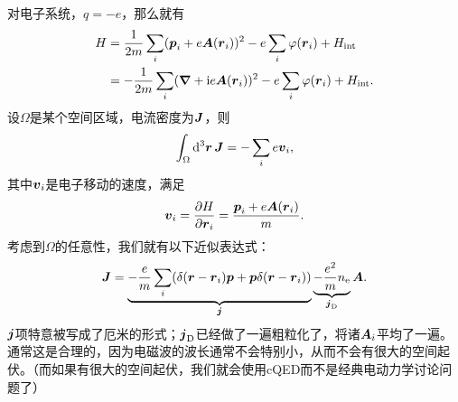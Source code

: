 对电子系统，$q=-e$，那么就有
\begin{equation}
    \begin{aligned}
        {H} &= \frac{1}{2m} \sum_i ({\vb*{p}_i} + e \vb*{A}({\vb*{r}_i}))^2 - e \sum_i \varphi({\vb*{r}}_i) + {H}_\text{int} \\ 
        &= - \frac{1}{2m} \sum_i (\grad + \mathrm{i} e \vb*{A}({\vb*{r}_i}))^2 - e \sum_i \varphi({\vb*{r}}_i) + {H}_\text{int}.
    \end{aligned}
\end{equation}
设$\Omega$是某个空间区域，电流密度为$\vb*{J}$，则
\begin{equation}
    \int_\Omega \dd[3]{\vb*{r}} {\vb*{J}} = - \sum_i e {\vb*{v}}_i,
\end{equation}
其中$\vb*{v}_i$是电子移动的速度，满足
\begin{equation}
    {\vb*{v}}_i = \pdv{H}{\vb*{r}_i} = \frac{{\vb*{p}}_i + e \vb*{A}({\vb*{r}}_i)}{m}.
\end{equation}
考虑到$\Omega$的任意性，我们就有以下近似表达式：
\begin{equation}
    {\vb*{J}} = \underbrace{- \frac{e}{m} \sum_i ( \delta(\vb*{r} - {\vb*{r}}_i) {\vb*{p}} + {\vb*{p}} \delta(\vb*{r} - {\vb*{r}}_i) )}_{{\vb*{j}}} \underbrace{- \frac{e^2}{m} {n}_\text{e}}_{{\vb*{j}}_\text{D}} \vb*{A}.
\end{equation}
${\vb*{j}}$项特意被写成了厄米的形式；${\vb*{j}}_\text{D}$已经做了一遍粗粒化了，将诸$\vb*{A}_i$平均了一遍。
通常这是合理的，因为电磁波的波长通常不会特别小，从而不会有很大的空间起伏。（而如果有很大的空间起伏，我们就会使用cQED而不是经典电动力学讨论问题了）

